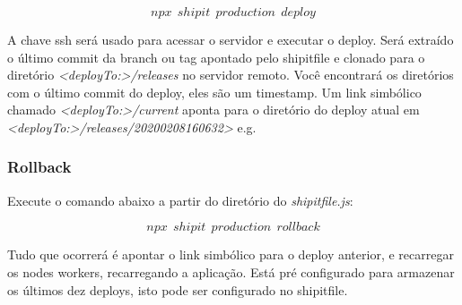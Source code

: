 $$npx\ \ shipit\ \ production\ \ deploy$$

A chave ssh será usado para acessar o servidor e executar o
deploy. Será extraído o último commit da branch ou tag apontado pelo
shipitfile e clonado para o diretório
\textit{<\textit{deployTo:}>/releases} no servidor remoto. Você
encontrará os diretórios com o último commit do deploy, eles são um
timestamp. Um link simbólico chamado \textit{<deployTo:>/current} aponta para o
diretório do deploy atual em
\textit{<deployTo:>/releases/20200208160632>} e.g.


\subsubsection{Rollback}
Execute o comando abaixo a partir do diretório do
\emph{shipitfile.js}:

$$npx\ \ shipit\ \ production\ \ rollback$$

Tudo que ocorrerá é apontar o link simbólico para o deploy anterior, e
recarregar os nodes workers, recarregando a aplicação. Está pré
configurado para armazenar os últimos dez deploys, isto pode ser
configurado no shipitfile.


